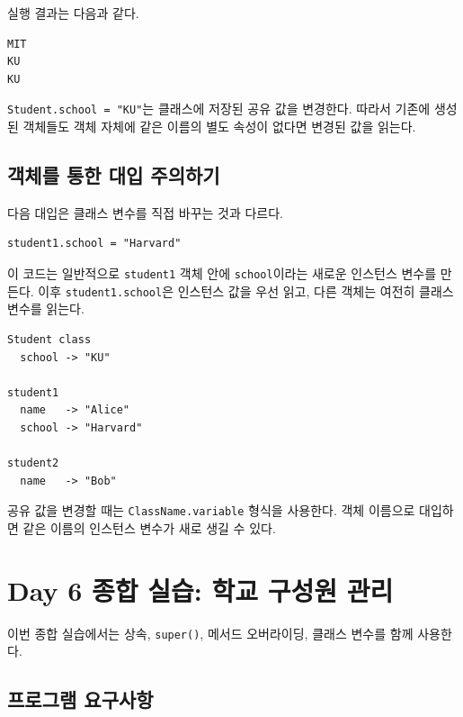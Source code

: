 \documentclass[11pt,a4paper]{article}
\begin{document}
실행 결과는 다음과 같다.

\begin{verbatim}
MIT
KU
KU
\end{verbatim}

\texttt{Student.school = "KU"}는 클래스에 저장된 공유 값을 변경한다. 따라서 기존에 생성된 객체들도 객체 자체에 같은 이름의 별도 속성이 없다면 변경된 값을 읽는다.

\subsection{객체를 통한 대입 주의하기}

다음 대입은 클래스 변수를 직접 바꾸는 것과 다르다.

\begin{lstlisting}
student1.school = "Harvard"
\end{lstlisting}

이 코드는 일반적으로 \texttt{student1} 객체 안에 \texttt{school}이라는 새로운 인스턴스 변수를 만든다. 이후 \texttt{student1.school}은 인스턴스 값을 우선 읽고, 다른 객체는 여전히 클래스 변수를 읽는다.

\begin{verbatim}
Student class
  school -> "KU"

student1
  name   -> "Alice"
  school -> "Harvard"

student2
  name   -> "Bob"
\end{verbatim}

\begin{importantbox}
공유 값을 변경할 때는 \texttt{ClassName.variable} 형식을 사용한다. 객체 이름으로 대입하면 같은 이름의 인스턴스 변수가 새로 생길 수 있다.
\end{importantbox}

\section{Day 6 종합 실습: 학교 구성원 관리}

이번 종합 실습에서는 상속, \texttt{super()}, 메서드 오버라이딩, 클래스 변수를 함께 사용한다.

\subsection{프로그램 요구사항}
\end{document}
